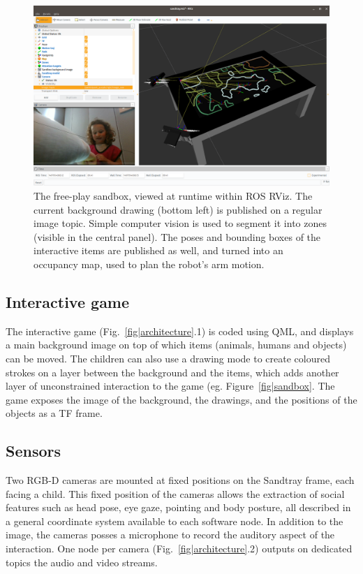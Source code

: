 \documentclass[sigconf]{acmart}
\begin{document}
\begin{figure}
    \centering
    \includegraphics[width=\linewidth]{rviz-sandtray}
    \caption{The free-play sandbox, viewed at runtime within ROS RViz. The
    current background drawing (bottom left) is published on a regular image
    topic. Simple computer vision is used to segment it into zones (visible in
    the central panel). The poses and bounding boxes of the interactive items
    are published as well, and turned into an occupancy map, used to plan the
    robot's arm motion.}
    \label{fig|rviz}
\end{figure}

\subsection{Interactive game} The interactive game
(Fig.~\ref{fig|architecture}.1) is coded using QML, and displays a main
background image on top of which items (animals, humans and objects) can be
moved.  The children can also use a drawing mode to create coloured strokes on a
layer between the background and the items, which adds another layer of
unconstrained interaction to the game (eg. Figure~\ref{fig|sandbox}. The game
exposes the image of the background, the drawings, and the positions of the
objects as a TF frame.

\subsection{Sensors} Two RGB-D cameras are mounted at fixed positions on the
Sandtray frame, each facing a child. This fixed position of the cameras allows
the extraction of social features such as head pose, eye gaze, pointing and body
posture, all described in a general coordinate system available to each software
node. In addition to the image, the cameras posses a microphone to record the
auditory aspect of the interaction. One node per camera
(Fig.~\ref{fig|architecture}.2) outputs on dedicated topics the audio and video
streams.
\end{document}
